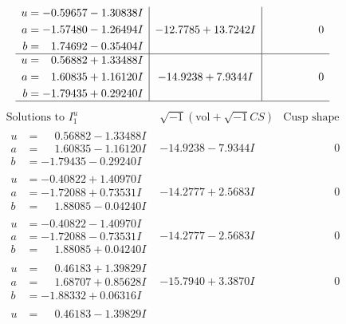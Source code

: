 \documentclass[1p]{elsarticle_modified}
\theoremstyle{definition}
\newcommand{\I}{\sqrt{-1}}
\begin{document}
$$\begin{array}{c|c|c}
\begin{aligned}
u &= -0.59657 - 1.30838 I \\
a &= -1.57480 - 1.26494 I \\
b &= \phantom{-}1.74692 - 0.35404 I\end{aligned}
 & -12.7785 + 13.7242 I & \phantom{-0.000000 } 0 \\ \hline\begin{aligned}
u &= \phantom{-}0.56882 + 1.33488 I \\
a &= \phantom{-}1.60835 + 1.16120 I \\
b &= -1.79435 + 0.29240 I\end{aligned}
 & -14.9238 + 7.9344 I & \phantom{-0.000000 } 0\\
 \hline 
 \end{array}$$\newpage$$\begin{array}{c|c|c}  
\text{Solutions to }I^u_{1}& \I (\text{vol} + \sqrt{-1}CS) & \text{Cusp shape}\\
 \hline 
\begin{aligned}
u &= \phantom{-}0.56882 - 1.33488 I \\
a &= \phantom{-}1.60835 - 1.16120 I \\
b &= -1.79435 - 0.29240 I\end{aligned}
 & -14.9238 - 7.9344 I & \phantom{-0.000000 } 0 \\ \hline\begin{aligned}
u &= -0.40822 + 1.40970 I \\
a &= -1.72088 + 0.73531 I \\
b &= \phantom{-}1.88085 - 0.04240 I\end{aligned}
 & -14.2777 + 2.5683 I & \phantom{-0.000000 } 0 \\ \hline\begin{aligned}
u &= -0.40822 - 1.40970 I \\
a &= -1.72088 - 0.73531 I \\
b &= \phantom{-}1.88085 + 0.04240 I\end{aligned}
 & -14.2777 - 2.5683 I & \phantom{-0.000000 } 0 \\ \hline\begin{aligned}
u &= \phantom{-}0.46183 + 1.39829 I \\
a &= \phantom{-}1.68707 + 0.85628 I \\
b &= -1.88332 + 0.06316 I\end{aligned}
 & -15.7940 + 3.3870 I & \phantom{-0.000000 } 0 \\ \hline\begin{aligned}
u &= \phantom{-}0.46183 - 1.39829 I \\

\end{aligned}
\end{array}$$
\end{document}
